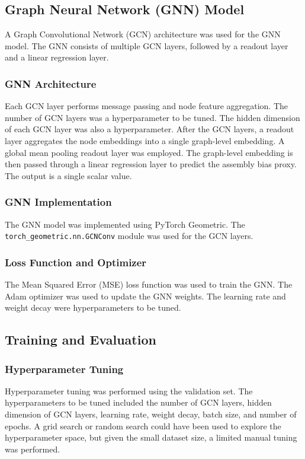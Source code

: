 \documentclass[twocolumn]{aastex631}
\begin{document}
\subsection{Graph Neural Network (GNN) Model}

A Graph Convolutional Network (GCN) architecture was used for the GNN model. The GNN consists of multiple GCN layers, followed by a readout layer and a linear regression layer.

\subsubsection{GNN Architecture}
Each GCN layer performs message passing and node feature aggregation. The number of GCN layers was a hyperparameter to be tuned. The hidden dimension of each GCN layer was also a hyperparameter. After the GCN layers, a readout layer aggregates the node embeddings into a single graph-level embedding. A global mean pooling readout layer was employed. The graph-level embedding is then passed through a linear regression layer to predict the assembly bias proxy. The output is a single scalar value.

\subsubsection{GNN Implementation}
The GNN model was implemented using PyTorch Geometric. The \texttt{torch\_geometric.nn.GCNConv} module was used for the GCN layers.

\subsubsection{Loss Function and Optimizer}
The Mean Squared Error (MSE) loss function was used to train the GNN. The Adam optimizer was used to update the GNN weights. The learning rate and weight decay were hyperparameters to be tuned.

\subsection{Training and Evaluation}

\subsubsection{Hyperparameter Tuning}
Hyperparameter tuning was performed using the validation set. The hyperparameters to be tuned included the number of GCN layers, hidden dimension of GCN layers, learning rate, weight decay, batch size, and number of epochs. A grid search or random search could have been used to explore the hyperparameter space, but given the small dataset size, a limited manual tuning was performed.
\end{document}
